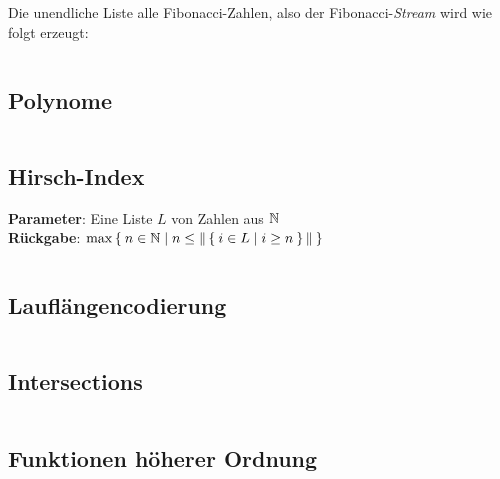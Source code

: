 Die unendliche Liste alle Fibonacci-Zahlen, also der Fibonacci-\textit{Stream}
wird wie folgt erzeugt:

\inputminted[linenos, numbersep=5pt, tabsize=4, frame=lines, label=fibonacci-stream.hs]{haskell}{scripts/haskell/fibonacci-stream.hs}

\subsection{Polynome}%
\inputminted[linenos, numbersep=5pt, tabsize=4, frame=lines, label=polynome.hs]{haskell}{scripts/haskell/polynome.hs}

\subsection{Hirsch-Index}%
\textbf{Parameter}: Eine Liste $L$ von Zahlen aus $\mathbb{N}$\\
\textbf{Rückgabe}: $\max \Set{n \in \ensuremath{\mathbb{N}}| n \leq \|\Set{i \in L | i \geq n}\|}$

\inputminted[linenos, numbersep=5pt, tabsize=4, frame=lines, label=hirsch-index.hs]{haskell}{scripts/haskell/hirsch-index.hs}

\subsection{Lauflängencodierung}%

\inputminted[linenos, numbersep=5pt, tabsize=4, frame=lines, label=lauflaengencodierung.hs]{haskell}{scripts/haskell/lauflaengencodierung.hs}

\subsection{Intersections}%

\inputminted[linenos, numbersep=5pt, tabsize=4, frame=lines, label=intersect.hs]{haskell}{scripts/haskell/intersect.hs}

\subsection{Funktionen höherer Ordnung}\label{bsp:foldl-und-foldr}
\inputminted[linenos, numbersep=5pt, tabsize=4, frame=lines, label=folds.hs]{haskell}{scripts/haskell/folds.hs}


